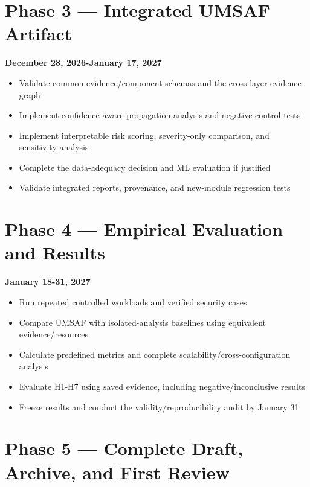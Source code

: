 \documentclass[
  12pt,
  letterpaper,
  oneside]{report}
\providecommand{\tightlist}{%
  \setlength{\itemsep}{0pt}\setlength{\parskip}{0pt}}
\begin{document}
\section{Phase 3 --- Integrated UMSAF
Artifact}\label{phase-3--integrated-umsaf-artifact}

\textbf{December 28, 2026-January 17, 2027}

\begin{itemize}
\tightlist
\item
  Validate common evidence/component schemas and the cross-layer
  evidence graph
\item
  Implement confidence-aware propagation analysis and negative-control
  tests
\item
  Implement interpretable risk scoring, severity-only comparison, and
  sensitivity analysis
\item
  Complete the data-adequacy decision and ML evaluation if justified
\item
  Validate integrated reports, provenance, and new-module regression
  tests
\end{itemize}

\section{Phase 4 --- Empirical Evaluation and
Results}\label{phase-4--empirical-evaluation-and-results}

\textbf{January 18-31, 2027}

\begin{itemize}
\tightlist
\item
  Run repeated controlled workloads and verified security cases
\item
  Compare UMSAF with isolated-analysis baselines using equivalent
  evidence/resources
\item
  Calculate predefined metrics and complete
  scalability/cross-configuration analysis
\item
  Evaluate H1-H7 using saved evidence, including negative/inconclusive
  results
\item
  Freeze results and conduct the validity/reproducibility audit by
  January 31
\end{itemize}

\section{Phase 5 --- Complete Draft, Archive, and First
Review}\label{phase-5--complete-draft-archive-and-first-review}
\end{document}
